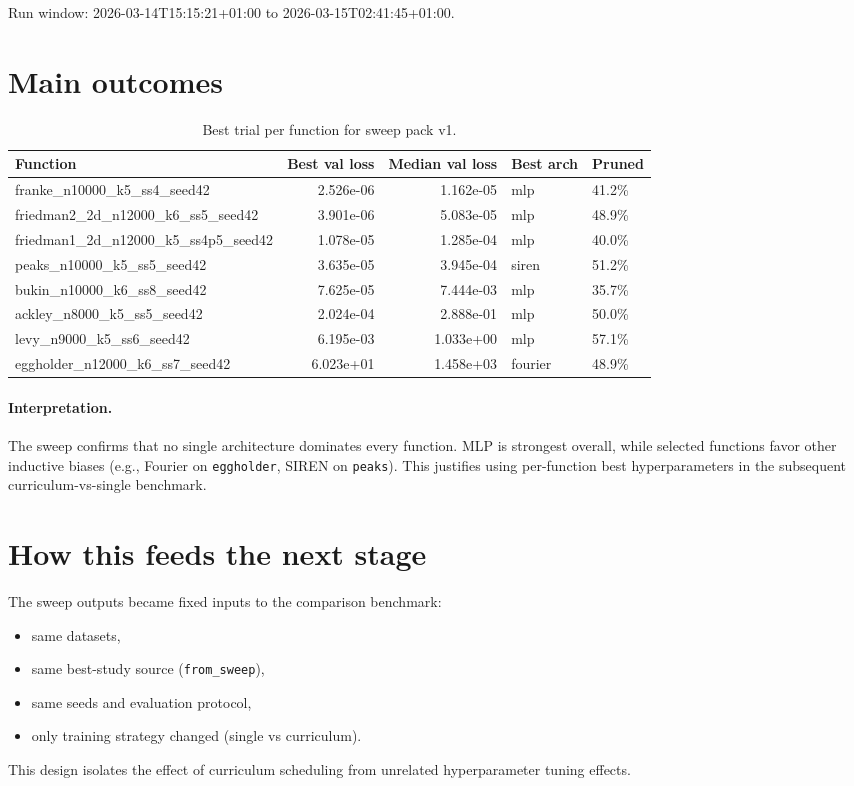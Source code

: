 Run window: 2026-03-14T15:15:21+01:00 to 2026-03-15T02:41:45+01:00.

\section{Main outcomes}

\begin{table}[h]
\centering
\small
\begin{tabular}{lrrll}
\toprule
Function & Best val loss & Median val loss & Best arch & Pruned \\
\midrule
franke\_n10000\_k5\_ss4\_seed42 & 2.526e-06 & 1.162e-05 & mlp & 41.2\% \\
friedman2\_2d\_n12000\_k6\_ss5\_seed42 & 3.901e-06 & 5.083e-05 & mlp & 48.9\% \\
friedman1\_2d\_n12000\_k5\_ss4p5\_seed42 & 1.078e-05 & 1.285e-04 & mlp & 40.0\% \\
peaks\_n10000\_k5\_ss5\_seed42 & 3.635e-05 & 3.945e-04 & siren & 51.2\% \\
bukin\_n10000\_k6\_ss8\_seed42 & 7.625e-05 & 7.444e-03 & mlp & 35.7\% \\
ackley\_n8000\_k5\_ss5\_seed42 & 2.024e-04 & 2.888e-01 & mlp & 50.0\% \\
levy\_n9000\_k5\_ss6\_seed42 & 6.195e-03 & 1.033e+00 & mlp & 57.1\% \\
eggholder\_n12000\_k6\_ss7\_seed42 & 6.023e+01 & 1.458e+03 & fourier & 48.9\% \\
\bottomrule
\end{tabular}
\caption{Best trial per function for sweep pack v1.}
\label{tab:sweep-pack-v1-best}
\end{table}

\paragraph{Interpretation.}
The sweep confirms that no single architecture dominates every function.
MLP is strongest overall, while selected functions favor other inductive biases
(e.g., Fourier on \texttt{eggholder}, SIREN on \texttt{peaks}). This justifies
using per-function best hyperparameters in the subsequent curriculum-vs-single
benchmark.

\section{How this feeds the next stage}

The sweep outputs became fixed inputs to the comparison benchmark:

\begin{itemize}
    \item same datasets,
    \item same best-study source (\texttt{from\_sweep}),
    \item same seeds and evaluation protocol,
    \item only training strategy changed (single vs curriculum).
\end{itemize}

This design isolates the effect of curriculum scheduling from unrelated
hyperparameter tuning effects.
